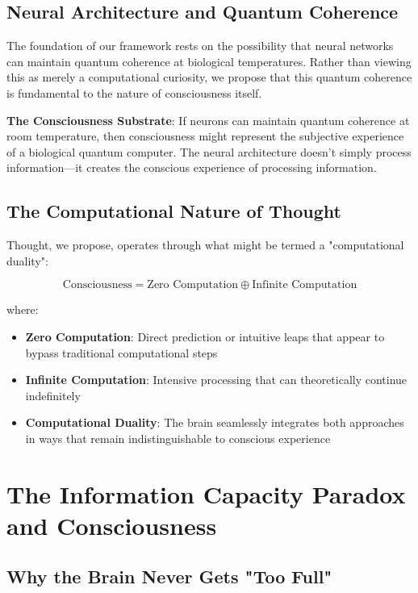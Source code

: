 \documentclass[12pt]{article}
\begin{document}
\subsection{Neural Architecture and Quantum Coherence}

The foundation of our framework rests on the possibility that neural networks can maintain quantum coherence at biological temperatures. Rather than viewing this as merely a computational curiosity, we propose that this quantum coherence is fundamental to the nature of consciousness itself.

\textbf{The Consciousness Substrate}: If neurons can maintain quantum coherence at room temperature, then consciousness might represent the subjective experience of a biological quantum computer. The neural architecture doesn't simply process information—it creates the conscious experience of processing information.

\subsection{The Computational Nature of Thought}

Thought, we propose, operates through what might be termed a "computational duality":

$$\text{Consciousness} = \text{Zero Computation} \oplus \text{Infinite Computation}$$

where:
\begin{itemize}
\item \textbf{Zero Computation}: Direct prediction or intuitive leaps that appear to bypass traditional computational steps
\item \textbf{Infinite Computation}: Intensive processing that can theoretically continue indefinitely
\item \textbf{Computational Duality}: The brain seamlessly integrates both approaches in ways that remain indistinguishable to conscious experience
\end{itemize}

\section{The Information Capacity Paradox and Consciousness}

\subsection{Why the Brain Never Gets "Too Full"}
\end{document}
